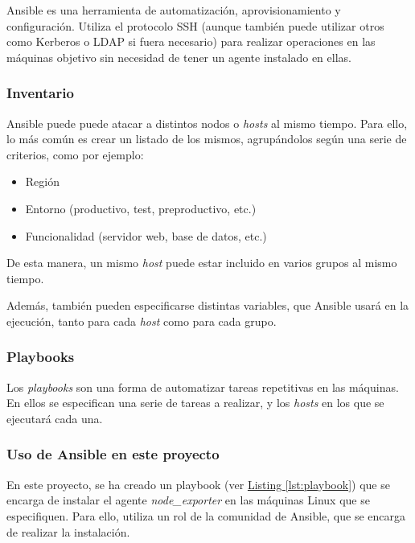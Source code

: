 Ansible\cite{ansible} es una herramienta de automatización, aprovisionamiento y configuración. Utiliza el protocolo SSH (aunque también puede utilizar otros como Kerberos o LDAP si fuera necesario) para realizar operaciones en las máquinas objetivo sin necesidad de tener un agente instalado en ellas.
\subsubsection{Inventario}
Ansible puede puede atacar a distintos nodos o \textit{hosts} al mismo tiempo. Para ello, lo más común es crear un listado de los mismos, agrupándolos según una serie de criterios, como por ejemplo:
\begin{itemize}
    \item Región
    \item Entorno (productivo, test, preproductivo, etc.)
    \item Funcionalidad (servidor web, base de datos, etc.)
\end{itemize}
De esta manera, un mismo \textit{host} puede estar incluido en varios grupos al mismo tiempo.

Además, también pueden especificarse distintas variables, que Ansible usará en la ejecución, tanto para cada \textit{host} como para cada grupo.

\subsubsection{Playbooks}
Los \textit{playbooks} son una forma de automatizar tareas repetitivas en las máquinas. En ellos se especifican una serie de tareas a realizar, y los \textit{hosts} en los que se ejecutará cada una. 

\subsubsection*{Uso de Ansible en este proyecto}
En este proyecto, se ha creado un playbook (ver \hyperref[lst:playbook]{Listing \ref{lst:playbook}}) que se encarga de instalar el agente \textit{node\_exporter} en las máquinas Linux que se especifiquen. Para ello, utiliza un rol de la comunidad de Ansible, que se encarga de realizar la instalación.

